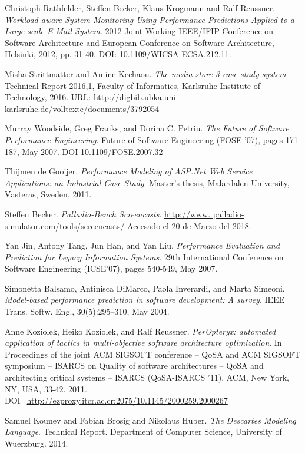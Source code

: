\documentclass[11pt, twoside]{report}
\begin{document}
\begin{thebibliography}{9}
 Christoph Rathfelder, Steffen Becker, Klaus Krogmann and Ralf Reussner. \emph{Workload-aware System Monitoring Using Performance Predictions Applied to a Large-scale E-Mail System}. 2012 Joint Working IEEE/IFIP Conference on Software Architecture and European Conference on Software Architecture, Helsinki, 2012, pp. 31-40.
DOI: \href{https://ezproxy.itcr.ac.cr:2878/10.1109/WICSA-ECSA.212.11}{10.1109/WICSA-ECSA.212.11}. 

 Misha Strittmatter and Amine Kechaou. \emph{The media store 3 case study system}. Technical Report 2016,1, Faculty of Informatics, Karlsruhe Institute of Technology, 2016. URL: \url{http://digbib.ubka.uni-karlsruhe.de/volltexte/documents/3792054}

 Murray Woodside, Greg Franks, and Dorina C. Petriu. \emph{The Future of Software Performance Engineering}. Future of Software Engineering (FOSE '07), pages 171-187, May 2007. DOI 10.1109/FOSE.2007.32

 Thijmen de Gooijer. \emph{Performance Modeling of ASP.Net Web
Service Applications: an Industrial Case Study}. Master's thesis, Malardalen University, Vasteras, Sweden, 2011.

 Steffen Becker. \emph{Palladio-Bench Screencasts}. \url{http://www.
palladio-simulator.com/tools/screencasts/} Accesado el 20 de Marzo del 2018.

 Yan Jin, Antony Tang, Jun Han, and Yan Liu. \emph{Performance Evaluation and Prediction for Legacy Information Systems}. 29th International Conference on Software Engineering (ICSE'07), pages 540-549, May 2007.

 Simonetta Balsamo, Antinisca DiMarco, Paola Inverardi, and Marta
Simeoni. \emph{Model-based performance prediction in software development: A survey}. IEEE Trans. Softw. Eng., 30(5):295–310, May 2004.

 Anne Koziolek, Heiko Koziolek, and Ralf Reussner. \emph{PerOpteryx: automated application of tactics in multi-objective software architecture optimization}. In Proceedings of the joint ACM SIGSOFT conference -- QoSA and ACM SIGSOFT symposium -- ISARCS on Quality of software architectures -- QoSA and architecting critical systems -- ISARCS (QoSA-ISARCS '11). ACM, New York, NY, USA, 33-42. 2011. DOI=\url{http://ezproxy.itcr.ac.cr:2075/10.1145/2000259.2000267}

 Samuel Kounev and Fabian Brosig and Nikolaus Huber. \emph{The Descartes Modeling Language}. Technical Report. Department of Computer Science, University of Wuerzburg. 2014.
%


\end{thebibliography}
\end{document}
